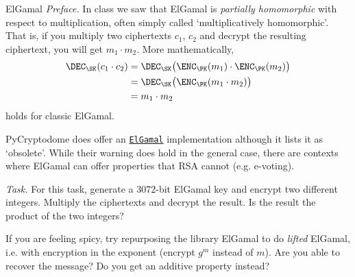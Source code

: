 \documentclass{practice}
\begin{document}
\begin{task}{ElGamal}
  \textit{Preface.}
  In class we saw that ElGamal is \emph{partially homomorphic} with respect to multiplication, often simply called `multiplicatively homomorphic'.
  That is, if you multiply two ciphertexts $c_1$, $c_2$ and decrypt the resulting ciphertext, you will get $m_1 \cdot m_2$.
  More mathematically,
  \begin{align*}
    \DEC_\SK(c_1 \cdot c_2) &= 
    \DEC_\SK\bigl(\ENC_\PK(m_1) \cdot \ENC_\PK(m_2)\bigr)\\
    &= \DEC_\SK\bigl(\ENC_\PK(m_1\cdot m_2)\bigr)\\
    &= m_1 \cdot m_2
  \end{align*}
  holds for classic ElGamal.

  PyCryptodome does offer an \href{https://pycryptodome.readthedocs.io/en/latest/src/public_key/elgamal.html}{\texttt{ElGamal}} implementation although it lists it as `obsolete'.
  While their warning does hold in the general case, there are contexts where ElGamal can offer properties that RSA cannot (e.g. e-voting).

  \textit{Task.}
  For this task, generate a $3072$-bit ElGamal key and encrypt two different integers.
  Multiply the ciphertexts and decrypt the result.
  Is the result the product of the two integers?

  If you are feeling spicy, try repurposing the library ElGamal to do \emph{lifted} ElGamal, i.e. with encryption in the exponent (encrypt $g^m$ instead of $m$).
  Are you able to recover the message?
  Do you get an additive property instead?
\end{task}
\end{document}
